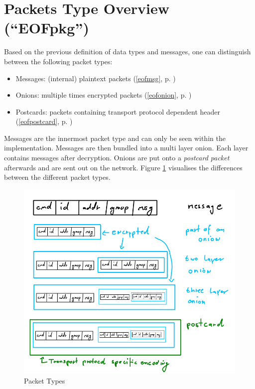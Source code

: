 \section{Packets Type Overview ("`EOFpkg"')}
\label{eofpkg}
Based on the previous definition of data types and messages, one
can distinguish between the following packet types:
\begin{itemize}
\item Messages: (internal) plaintext packets (\ref{eofmsg}, p. \pageref{eofmsg})
\item Onions: multiple times encrypted packets (\ref{eofonion}, p. \pageref{eofonion})
\item Postcards: packets containing transport protocol dependent header (\ref{eofpostcard}, p. \pageref{eofpostcard})
\end{itemize}
Messages are the innermost packet type and can only be seen within
the implementation.
Messages are then bundled into a multi layer onion. 
Each layer contains messages after decryption.
Onions are put onto a \textit{postcard packet} 
afterwards and are sent out on the network.
Figure \ref{packettypes} visualises the differences between the 
different packet types.
\begin{figure}[htb]
    \centering
    \caption{Packet Types}
    \label{packettypes}
    \includegraphics[scale=0.7]{packet-types.png}
\end{figure}
